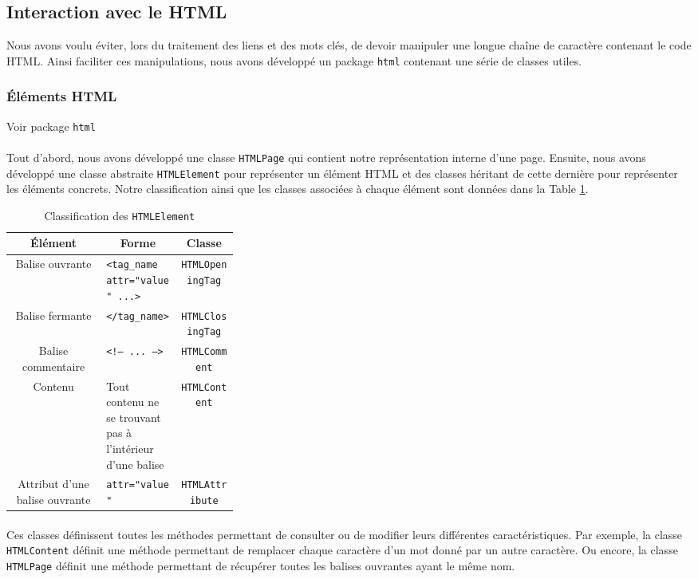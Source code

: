 \documentclass[a4paper,11pt]{article}
\newcommand{\ttseek}[1]{Voir package \texttt{#1}\paragraph{}}
\begin{document}
\subsection{Interaction avec le HTML}
Nous avons voulu éviter, lors du traitement des liens et des mots clés, de devoir manipuler une longue chaîne de caractère contenant le code HTML. Ainsi faciliter ces manipulations, nous avons développé un package \texttt{html} contenant une série de classes utiles. 
\subsubsection{Éléments HTML}
\ttseek{html}
Tout d'abord, nous avons développé une classe \texttt{HTMLPage} qui contient notre représentation interne d'une page.
Ensuite, nous avons développé une classe abstraite \texttt{HTMLElement} pour représenter un élément HTML et des classes héritant de cette dernière pour représenter les éléments concrets. Notre classification ainsi que les classes associées à chaque élément sont données dans la Table \ref{tab:htmlelement}.
\begin{table}[h]
	\center
	\begin{tabular}{|c|p{0.33\linewidth}|c|}
		\hline
		\textbf{Élément} & \multicolumn{1}{c|}{\textbf{Forme}} & \textbf{Classe}\\
		\hline
		Balise ouvrante & \texttt{<tag\_name attr="value" ...>} & \texttt{HTMLOpeningTag}\\
		\hline
		Balise fermante & \texttt{</tag\_name>} & \texttt{HTMLClosingTag}\\
		\hline
		Balise commentaire & \texttt{<!-- ... -->} & \texttt{HTMLComment} \\
		\hline
		Contenu & Tout contenu ne se trouvant pas à l'intérieur d'une balise & \texttt{HTMLContent}\\
		\hline
		Attribut d'une balise ouvrante & \texttt{attr="value"} & \texttt{HTMLAttribute}\\
		\hline
	\end{tabular}
	\caption{Classification des \texttt{HTMLElement}}
	\label{tab:htmlelement}
\end{table}
\paragraph{} Ces classes définissent toutes les méthodes permettant de consulter ou de modifier leurs différentes caractéristiques. Par exemple, la classe \texttt{HTMLContent} définit une méthode permettant de remplacer chaque caractère d'un mot donné par un autre caractère. Ou encore, la classe \texttt{HTMLPage} définit une méthode permettant de récupérer toutes les balises ouvrantes ayant le même nom.
\end{document}
